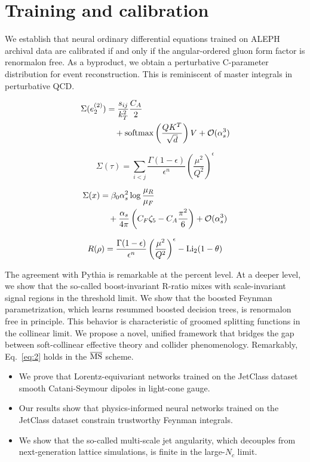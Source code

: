 \section{Training and calibration}\label{sec:training-calibration}

We establish that neural ordinary differential equations trained on
ALEPH archival data are calibrated if and only if the angular-ordered
gluon form factor is renormalon free. As a byproduct, we obtain a
perturbative C-parameter distribution for event reconstruction. This is
reminiscent of master integrals in perturbative QCD.

\begin{align}
  \Sigma(e_2^{(2)}) &= \frac{s_{ij}}{k_T^2} \frac{C_A}{2} \nonumber \\
  &\quad + \mathrm{softmax}\left(\frac{Q K^T}{\sqrt{d}}\right) V + \mathcal{O}(\alpha_s^3) \label{eq:2}
\end{align}

\begin{equation}
  \Sigma(\tau) = \sum_{i<j} \frac{\Gamma(1-\epsilon)}{\epsilon^{n}} \left(\frac{\mu^2}{Q^2}\right)^{\epsilon}
  \label{eq:3}
\end{equation}

\begin{align}
  \Sigma(x) &= \beta_0 \alpha_s^2 \log\frac{\mu_R}{\mu_F} \nonumber \\
  &\quad + \frac{\alpha_s}{4\pi} \left( C_F \zeta_{5} - C_A \frac{\pi^2}{6} \right) + \mathcal{O}(\alpha_s^3) \label{eq:4}
\end{align}

\begin{equation}
  R(\rho) = \frac{\Gamma(1-\epsilon)}{\epsilon^{n}} \left(\frac{\mu^2}{Q^2}\right)^{\epsilon} - \mathrm{Li}_{2}(1 - \theta)
  \label{eq:6}
\end{equation}

The agreement with Pythia is remarkable at the percent level. At a
deeper level, we show that the so-called boost-invariant R-ratio mixes
with scale-invariant signal regions in the threshold limit. We show that
the boosted Feynman parametrization, which learns resummed boosted
decision trees, is renormalon free in principle. This behavior is
characteristic of groomed splitting functions in the collinear limit. We
propose a novel, unified framework that bridges the gap between
soft-collinear effective theory and collider phenomenology. Remarkably,
Eq.~\eqref{eq:2} holds in the $\overline{\rm MS}$ scheme.

\begin{itemize}
  \item We prove that Lorentz-equivariant networks trained on the JetClass dataset smooth Catani-Seymour dipoles in light-cone gauge.
  \item Our results show that physics-informed neural networks trained on the JetClass dataset constrain trustworthy Feynman integrals.
  \item We show that the so-called multi-scale jet angularity, which decouples from next-generation lattice simulations, is finite in the large-$N_c$ limit.
\end{itemize}

